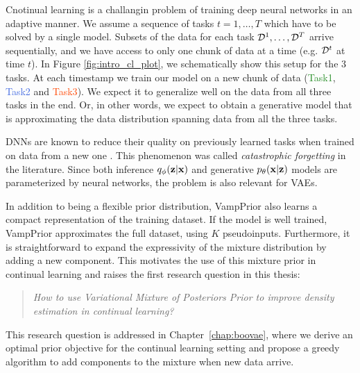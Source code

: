 Cnotinual learning is a challangin problem of training deep neural networks in an adaptive manner. We assume a sequence of tasks $t=1,\dots,T$ which have to be solved by a single model.
Subsets of the data for each task $\mathcal{D}^1, \dots ,\mathcal{D}^T$ arrive sequentially, and we have access to only one chunk of data at a time (e.g. $\mathcal{D}^t$ at time $t$). In Figure \ref{fig:intro_cl_plot}, we schematically show this setup for the 3 tasks. At each timestamp we train our model on a new chunk of data (\textcolor{ForestGreen}{Task1}, \textcolor{RoyalBlue}{Task2} and \textcolor{OrangeRed}{Task3}). We expect it to generalize well on the data from all three tasks in the end. Or, in other words, we expect to obtain a generative model that is approximating the data distribution spanning data from all the three tasks.   

DNNs are known to reduce their quality on previously learned tasks when trained on data from a new one \citep{kirkpatrick2017overcoming}. This phenomenon was called \textit{catastrophic forgetting} \citep{mccloskey1989catastrophic} in the literature. Since both inference ${q_{\phi}({\mathbf{z}}|{\mathbf{x}})}$ and generative ${p_{\theta}({\mathbf{x}}|{\mathbf{z}})}$ models are parameterized by neural networks, the problem is also relevant for VAEs.  

In addition to being a flexible prior distribution, VampPrior also learns a compact representation of the training dataset. If the model is well trained, VampPrior approximates the full dataset, using $K$ pseudoinputs. 
Furthermore, it is straightforward to expand the expressivity of the mixture distribution by adding a new component.
This motivates the use of this mixture prior in continual learning and raises the first research question in this thesis:

\begin{quote}
	\textit{How to use Variational Mixture of Posteriors Prior to improve density estimation in continual learning?}
\end{quote}
This research question is addressed in Chapter~\ref{chap:boovae}, where we derive an optimal prior objective for the continual learning setting and propose a greedy algorithm to add components to the mixture when new data arrive. 


